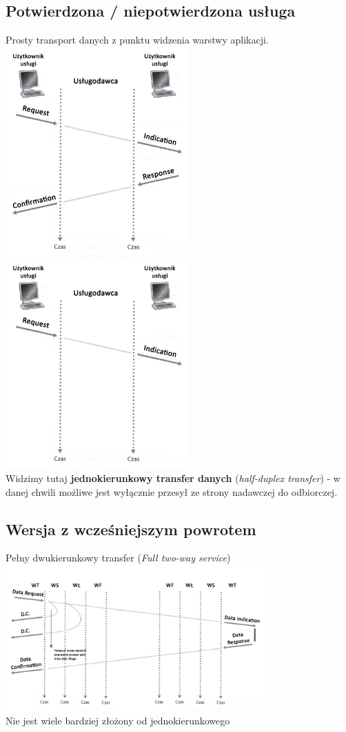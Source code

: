 		\subsection{Potwierdzona / niepotwierdzona usługa}
			Prosty transport danych z punktu widzenia warstwy aplikacji.\\
			\includegraphics[width=7cm]{./images/image03_confirmation.jpg}
			\includegraphics[width=7cm]{./images/image03_no_confirmation.jpg}\\
			Widzimy tutaj \textbf{jednokierunkowy transfer danych} (\emph{half-duplex transfer}) - w danej chwili możliwe jest wyłącznie przesył ze strony nadawczej do odbiorczej.
		\subsection{Wersja z wcześniejszym powrotem}
			Pełny dwukierunkowy transfer (\emph{Full two-way service})\\
			\includegraphics[width=10cm]{./images/image04.jpg}\\
			Nie jest wiele bardziej złożony od jednokierunkowego
